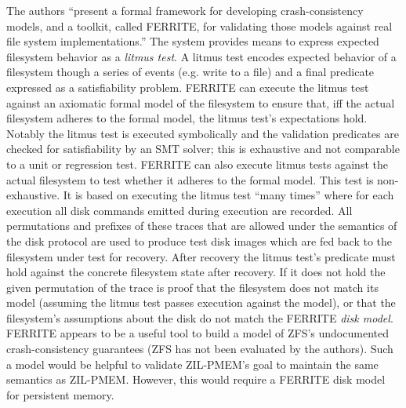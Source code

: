 \documentclass[12pt,a4paper,twoside]{book}
\begin{document}
The authors
“present a formal framework for developing crash-consistency models, and a toolkit, called FERRITE, for validating those models against real file system implementations.”
The system provides means to express expected filesystem behavior as a \textit{litmus test}.
A litmus test encodes expected behavior of a filesystem though a series of events (e.g. write to a file) and a final predicate expressed as a satisfiability problem.
FERRITE can execute the litmus test against an axiomatic formal model of the filesystem to ensure that, iff the actual filesystem adheres to the formal model, the litmus test’s expectations hold.
Notably the litmus test is executed symbolically and the validation predicates are checked for satisfiability by an SMT solver; this is exhaustive and not comparable to a unit  or regression test.
FERRITE can also execute litmus tests against the actual filesystem to test whether it adheres to the formal model.
This test is non-exhaustive.
It is based on executing the litmus test “many times” where for each execution all disk commands emitted during execution are recorded.
All permutations and prefixes of these traces that are allowed under the semantics of the disk protocol are used to produce test disk images which are fed back to the filesystem under test for recovery.
After recovery the litmus test’s predicate must hold against the concrete filesystem state after recovery.
If it does not hold the given permutation of the trace is proof that the filesystem does not match its model (assuming the litmus test passes execution against the model), or that the filesystem’s assumptions about the disk do not match the FERRITE \textit{disk model}.
FERRITE appears to be a useful tool to build a model of ZFS’s undocumented crash-consistency guarantees (ZFS has not been evaluated by the authors).
Such a model would be helpful to validate ZIL-PMEM's goal to maintain the same semantics as ZIL-PMEM.
However, this would require a FERRITE disk model for persistent memory.
\end{document}
